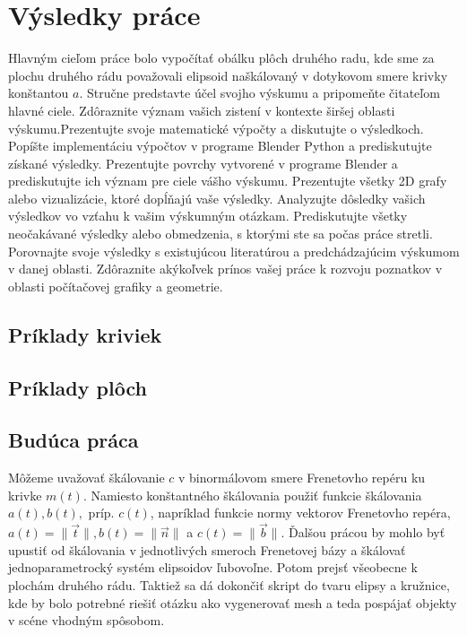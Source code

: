 \chapter{Výsledky práce}
Hlavným cieľom práce bolo vypočítať obálku plôch druhého radu, kde sme za plochu druhého rádu považovali elipsoid naškálovaný v dotykovom smere krivky konštantou $a$.
Stručne predstavte účel svojho výskumu a pripomeňte čitateľom hlavné ciele. Zdôraznite význam vašich zistení v kontexte širšej oblasti výskumu.Prezentujte svoje matematické výpočty a diskutujte o výsledkoch. Popíšte implementáciu výpočtov v programe Blender Python a prediskutujte získané výsledky.
Prezentujte povrchy vytvorené v programe Blender a prediskutujte ich význam pre ciele vášho výskumu.
Prezentujte všetky 2D grafy alebo vizualizácie, ktoré dopĺňajú vaše výsledky.
Analyzujte dôsledky vašich výsledkov vo vzťahu k vašim výskumným otázkam.
Prediskutujte všetky neočakávané výsledky alebo obmedzenia, s ktorými ste sa počas práce stretli.
Porovnajte svoje výsledky s existujúcou literatúrou a predchádzajúcim výskumom v danej oblasti.
Zdôraznite akýkoľvek prínos vašej práce k rozvoju poznatkov v oblasti počítačovej grafiky a geometrie.

\section{Príklady kriviek}
\section{Príklady plôch}
\section{Budúca práca}
Môžeme uvažovať škálovanie $c$ v binormálovom smere Frenetovho repéru ku krivke $m(t)$. Namiesto konštantného škálovania použiť funkcie škálovania $a(t), b(t),$ príp. $c(t)$, napríklad funkcie normy vektorov Frenetovho repéra, $a(t) = \| \vec{t} \|, b(t) = \| \vec{n} \| $ a $c(t) = \| \vec{b} \|$. Ďalšou prácou by mohlo byť upustiť od škálovania v jednotlivých smeroch Frenetovej bázy a škálovať jednoparametrocký systém elipsoidov ľubovoľne. Potom prejsť všeobecne k plochám druhého rádu.
Taktiež sa dá dokončiť skript do tvaru elipsy a kružnice, kde by bolo potrebné riešiť otázku ako vygenerovať mesh a teda pospájať objekty v scéne vhodným spôsobom.